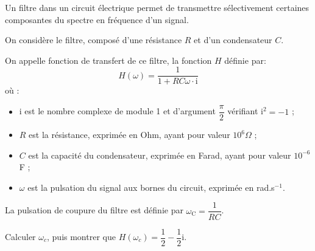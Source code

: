 \medskip

Un filtre dans un circuit électrique permet de transmettre sélectivement certaines composantes du spectre en fréquence d'un signal.

On considère le filtre, composé d'une résistance $R$ et d'un condensateur $C$.

On appelle fonction de transfert de ce filtre, la fonction $H$ définie par: 
\[H(\omega) = \dfrac{1}{1 + RC \omega \cdot \text{i}}\]
où :
\begin{itemize}
\item i est le nombre complexe de module 1 et d'argument $\dfrac{\pi}{2}$ vérifiant i$^2 = -1$ ;
\item $R$ est la résistance, exprimée en Ohm, ayant pour valeur $10^6 \Omega$ ;
\item $C$ est la capacité du condensateur, exprimée en Farad, ayant pour valeur $10^{- 6}$ F ;
\item $\omega$ est la pulsation du signal aux bornes du circuit, exprimée en rad.s$^{- 1}$.
\end{itemize}

\medskip

La pulsation de coupure du filtre est définie par $\omega_{\text{C}} = \dfrac{1}{RC}$.

Calculer $\omega_{c}$, puis montrer que $H\left(\omega_{c}\right) = \dfrac12 - \dfrac12\text{i}$.

\bigskip
